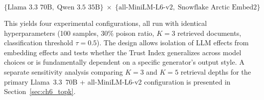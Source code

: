 \begin{equation*}
\{\text{Llama 3.3 70B},\; \text{Qwen 3.5 35B}\} \;\times\;
\{\text{all-MiniLM-L6-v2},\; \text{Snowflake Arctic Embed2}\}
\end{equation*}

This yields four experimental configurations, all run with identical hyperparameters (100 samples, 30\% poison ratio, $K=3$ retrieved documents, classification threshold $\tau=0.5$). The design allows isolation of LLM effects from embedding effects and tests whether the Trust Index generalizes across model choices or is fundamentally dependent on a specific generator's output style. A separate sensitivity analysis comparing $K=3$ and $K=5$ retrieval depths for the primary Llama~3.3~70B + all-MiniLM-L6-v2 configuration is presented in Section~\ref{sec:ch6_topk}.

